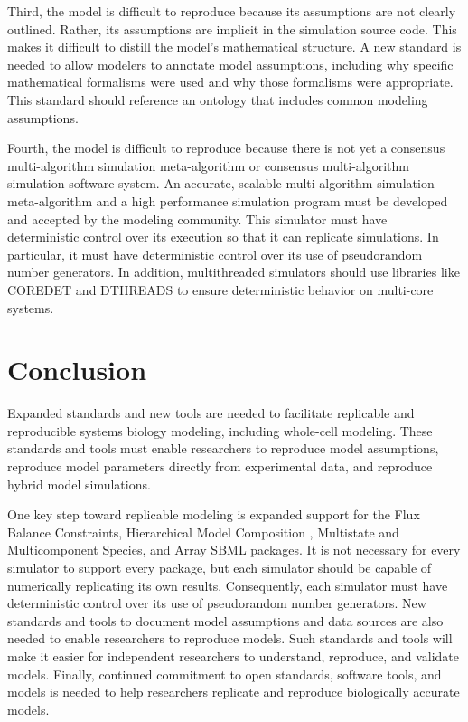 \documentclass[journal,transmag,twoside]{IEEEtran}
\begin{document}
Third, the model is difficult to reproduce because its assumptions are not clearly outlined. Rather, its assumptions are
implicit in the simulation source code. This makes it difficult
to distill the model's mathematical structure. A new standard is needed to allow modelers to annotate model assumptions, including why
specific mathematical formalisms were used and why those formalisms were appropriate. This standard should reference an ontology that 
includes common modeling assumptions.

Fourth, the model is difficult to reproduce because there is not yet a consensus multi-algorithm simulation meta-algorithm 
or consensus multi-algorithm simulation software system. An accurate, scalable multi-algorithm simulation meta-algorithm
and a high performance simulation program must be developed and accepted by the modeling community. This 
simulator must have deterministic control over its execution so that it can replicate 
simulations. In particular, it must have deterministic control over its use of pseudorandom number generators. 
In addition, multithreaded simulators should use libraries like C{\small ORE}D{\small ET} and D{\small THREADS} to 
ensure deterministic behavior on multi-core systems.

\section{Conclusion}

Expanded standards and new tools are needed to facilitate replicable and reproducible systems biology modeling, including whole-cell modeling.
These standards and tools must enable researchers to reproduce model assumptions, reproduce model parameters
directly from experimental data, and reproduce hybrid model simulations. 

One key step toward replicable modeling is expanded support for the 
Flux Balance Constraints, Hierarchical Model Composition \cite{smith2015sbml}, Multistate and Multicomponent
Species, and Array SBML packages. It is not necessary for every simulator
to support every package, but each simulator should be capable of numerically replicating its own results.
Consequently, each simulator must have deterministic control over its use of pseudorandom number generators.
New standards and tools to document model assumptions and data sources are also needed to enable researchers to reproduce models.
Such standards and tools will make it easier for independent researchers to understand, reproduce, and validate models. 
Finally, continued commitment to open standards, software tools, and models is needed to help researchers replicate and reproduce biologically accurate models.
\end{document}
